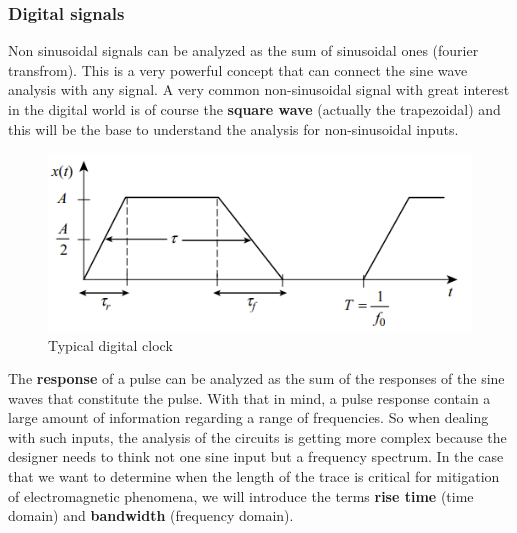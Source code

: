 \documentclass[final]{cubedoc}
\begin{document}
	
	\subsubsection{Digital signals}
	
	Non sinusoidal signals can be analyzed as the sum of sinusoidal ones (fourier transfrom). This is a very powerful concept that can connect the sine wave analysis with any signal. A very common non-sinusoidal signal with great interest in the digital world is of course the \textbf{square wave} (actually the trapezoidal) and this will be the base to understand the analysis for non-sinusoidal inputs.
	
	\begin{figure}[h!]
		\centering
		\includegraphics[keepaspectratio, width = \textwidth]{assets/clock_signal.png}
		\caption{Typical digital clock \cite[p.2]{paul2011transmission}}
	\end{figure}
	
	
	The \textbf{response} of a pulse can be analyzed as the sum of the responses of the sine waves that constitute the pulse. With that in mind, a pulse response contain a large amount of information regarding a range of frequencies. So when dealing with such inputs, the analysis of the circuits is getting more complex because the designer needs to think not one sine input but a frequency spectrum. In the case that we want to determine when the length of the trace is critical for mitigation of electromagnetic phenomena, we will introduce the terms \textbf{rise time} (time domain) and \textbf{bandwidth} (frequency domain).
	
\end{document}

